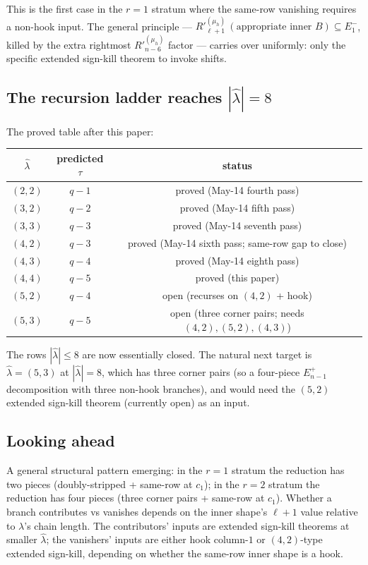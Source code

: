 \documentclass[11pt]{article}
\theoremstyle{definition}
\newcommand{\hatl}{\widehat\lambda}
\newcommand{\Rp}{{R'}}
\begin{document}
This is the first case in the $r = 1$ stratum where the same-row
vanishing requires a non-hook input.  The general principle ---
$\Rp^{(\mu_h)}_{\ell+1}\,(\text{appropriate inner $B$}) \subseteq E_1^-$,
killed by the extra rightmost $\Rp^{(\mu_h)}_{n-6}$ factor --- carries
over uniformly: only the specific extended sign-kill theorem to invoke
shifts.

\subsection{The recursion ladder reaches $|\hatl| = 8$}

The proved table after this paper:
\begin{center}
\begin{tabular}{c|c|c}
$\hatl$ & predicted $\tau$ & status \\
\hline
$(2, 2)$ & $q - 1$ & proved (May-14 fourth pass) \\
$(3, 2)$ & $q - 2$ & proved (May-14 fifth pass) \\
$(3, 3)$ & $q - 3$ & proved (May-14 seventh pass) \\
$(4, 2)$ & $q - 3$ & proved (May-14 sixth pass; same-row gap to close) \\
$(4, 3)$ & $q - 4$ & proved (May-14 eighth pass) \\
$(4, 4)$ & $q - 5$ & proved (this paper) \\
\hline
$(5, 2)$ & $q - 4$ & open (recurses on $(4, 2)$ + hook) \\
$(5, 3)$ & $q - 5$ & open (three corner pairs; needs $(4, 2), (5, 2), (4, 3)$) \\
\end{tabular}
\end{center}
The rows $|\hatl| \le 8$ are now essentially closed.  The natural
next target is $\hatl = (5, 3)$ at $|\hatl| = 8$, which has three
corner pairs (so a four-piece $E_{n-1}^+$ decomposition with three
non-hook branches), and would need the $(5, 2)$ extended sign-kill
theorem (currently open) as an input.

\subsection{Looking ahead}

A general structural pattern emerging: in the $r = 1$ stratum the
reduction has two pieces (doubly-stripped + same-row at $c_1$);
in the $r = 2$ stratum the reduction has four pieces (three corner
pairs + same-row at $c_1$).  Whether a branch contributes vs vanishes
depends on the inner shape's $\ell + 1$ value relative to $\lambda$'s
chain length.  The contributors' inputs are extended sign-kill
theorems at smaller $\hatl$; the vanishers' inputs are either hook
column-$1$ or $(4, 2)$-type extended sign-kill, depending on whether
the same-row inner shape is a hook.
\end{document}
